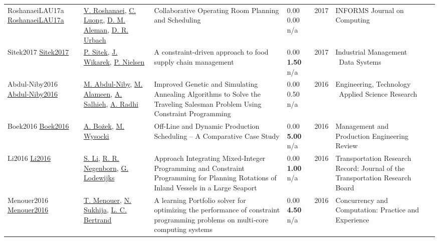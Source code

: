 {\begin{longtable}{p{3cm}p{5cm}p{10cm}p{1cm}rp{2.5cm}l}
RoshanaeiLAU17a \href{http://dx.doi.org/10.1287/ijoc.2017.0745}{RoshanaeiLAU17a} & \hyperref[auth:a728]{V. Roshanaei}, \hyperref[auth:a927]{C. Luong}, \hyperref[auth:a895]{D. M. Aleman}, \hyperref[auth:a896]{D. R. Urbach} & Collaborative Operating Room Planning and Scheduling & \noindent{}\textcolor{black!50}{0.00} \textcolor{black!50}{0.00} n/a & 2017 & \cellcolor{red!20}INFORMS Journal on Computing & \cite{RoshanaeiLAU17a}\\
Sitek2017 \href{http://dx.doi.org/10.1108/imds-10-2016-0465}{Sitek2017} & \hyperref[auth:a536]{P. Sitek}, \hyperref[auth:a535]{J. Wikarek}, \hyperref[auth:a1527]{P. Nielsen} & \cellcolor{gold!20}A constraint-driven approach to food supply chain management & \noindent{}\textcolor{black!50}{0.00} \textbf{1.50} n/a & 2017 & Industrial Management \  Data Systems & \cite{Sitek2017}\\
Abdul-Niby2016 \href{http://dx.doi.org/10.48084/etasr.627}{Abdul-Niby2016} & \hyperref[auth:a1855]{M. Abdul-Niby}, \hyperref[auth:a1856]{M. Alameen}, \hyperref[auth:a1857]{A. Salhieh}, \hyperref[auth:a1858]{A. Radhi} & Improved Genetic and Simulating Annealing Algorithms to Solve the Traveling Salesman Problem Using Constraint Programming & \noindent{}\textcolor{black!50}{0.00} 0.50 n/a & 2016 & Engineering, Technology \  Applied Science Research & \cite{Abdul-Niby2016}\\
Boek2016 \href{http://dx.doi.org/10.1515/mper-2016-0003}{Boek2016} & \hyperref[auth:a1885]{A. Bożek}, \hyperref[auth:a1886]{M. Wysocki} & \cellcolor{gold!20}Off-Line and Dynamic Production Scheduling – A Comparative Case Study & \noindent{}\textcolor{black!50}{0.00} \textbf{5.00} n/a & 2016 & Management and Production Engineering Review & \cite{Boek2016}\\
Li2016 \href{http://dx.doi.org/10.3141/2549-01}{Li2016} & \hyperref[auth:a2066]{S. Li}, \hyperref[auth:a2067]{R. R. Negenborn}, \hyperref[auth:a2068]{G. Lodewijks} & Approach Integrating Mixed-Integer Programming and Constraint Programming for Planning Rotations of Inland Vessels in a Large Seaport & \noindent{}\textcolor{black!50}{0.00} \textbf{1.00} n/a & 2016 & Transportation Research Record: Journal of the Transportation Research Board & \cite{Li2016}\\
Menouer2016 \href{http://dx.doi.org/10.1002/cpe.3840}{Menouer2016} & \hyperref[auth:a1976]{T. Menouer}, \hyperref[auth:a1977]{N. Sukhija}, \hyperref[auth:a1978]{L. C. Bertrand} & A learning Portfolio solver for optimizing the performance of constraint programming problems on multi‐core computing systems & \noindent{}\textcolor{black!50}{0.00} \textbf{4.50} n/a & 2016 & Concurrency and Computation: Practice and Experience & \cite{Menouer2016}\\

\end{longtable}}
